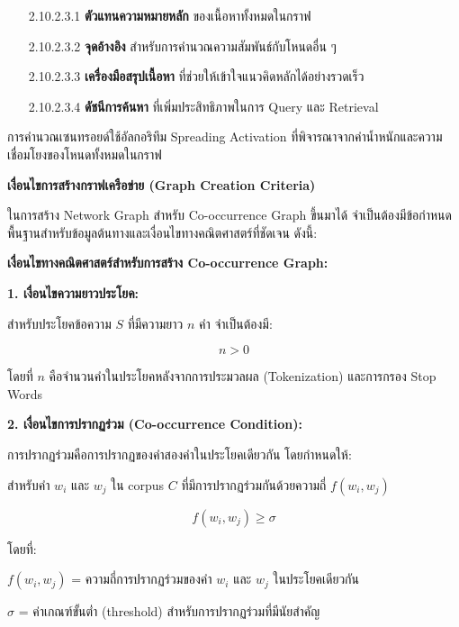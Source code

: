 \documentclass[12pt,a4paper]{article}
\begin{document}
\begin{enumerate}[leftmargin=2cm]
\begin{enumerate}
{\begin{enumerate}
            \begin{enumerate}
                \item[2.10.2.3.1] \textbf{ตัวแทนความหมายหลัก} ของเนื้อหาทั้งหมดในกราฟ
                \item[2.10.2.3.2] \textbf{จุดอ้างอิง} สำหรับการคำนวณความสัมพันธ์กับโหนดอื่น ๆ
                \item[2.10.2.3.3] \textbf{เครื่องมือสรุปเนื้อหา} ที่ช่วยให้เข้าใจแนวคิดหลักได้อย่างรวดเร็ว
                \item[2.10.2.3.4] \textbf{ดัชนีการค้นหา} ที่เพิ่มประสิทธิภาพในการ Query และ Retrieval
            \end{enumerate}

            การคำนวณเซนทรอยด์ใช้อัลกอริทึม Spreading Activation ที่พิจารณาจากค่าน้ำหนักและความเชื่อมโยงของโหนดทั้งหมดในกราฟ

            \vspace{0.3cm}

            \textbf{เงื่อนไขการสร้างกราฟเครือข่าย (Graph Creation Criteria)}

            \hspace{1cm}ในการสร้าง Network Graph สำหรับ Co-occurrence Graph ขึ้นมาได้ จำเป็นต้องมีข้อกำหนดพื้นฐานสำหรับข้อมูลต้นทางและเงื่อนไขทางคณิตศาสตร์ที่ชัดเจน ดังนี้:

            \textbf{เงื่อนไขทางคณิตศาสตร์สำหรับการสร้าง Co-occurrence Graph:}

            \textbf{1. เงื่อนไขความยาวประโยค:}
            
            สำหรับประโยคข้อความ $S$ ที่มีความยาว $n$ คำ จำเป็นต้องมี:
            
            $$n > 0$$
            
            โดยที่ $n$ คือจำนวนคำในประโยคหลังจากการประมวลผล (Tokenization) และการกรอง Stop Words

            \textbf{2. เงื่อนไขการปรากฏร่วม (Co-occurrence Condition):}

            การปรากฏร่วมคือการปรากฏของคำสองคำในประโยคเดียวกัน โดยกำหนดให้:

            สำหรับคำ $w_i$ และ $w_j$ ใน corpus $C$ ที่มีการปรากฏร่วมกันด้วยความถี่ $f(w_i, w_j)$

            $$f(w_i, w_j) \geq \sigma$$

            โดยที่:
            
            $f(w_i, w_j)$ = ความถี่การปรากฏร่วมของคำ $w_i$ และ $w_j$ ในประโยคเดียวกัน
            
            $\sigma$ = ค่าเกณฑ์ขั้นต่ำ (threshold) สำหรับการปรากฏร่วมที่มีนัยสำคัญ
            

\end{enumerate}}
\end{enumerate}
\end{enumerate}
\end{document}
